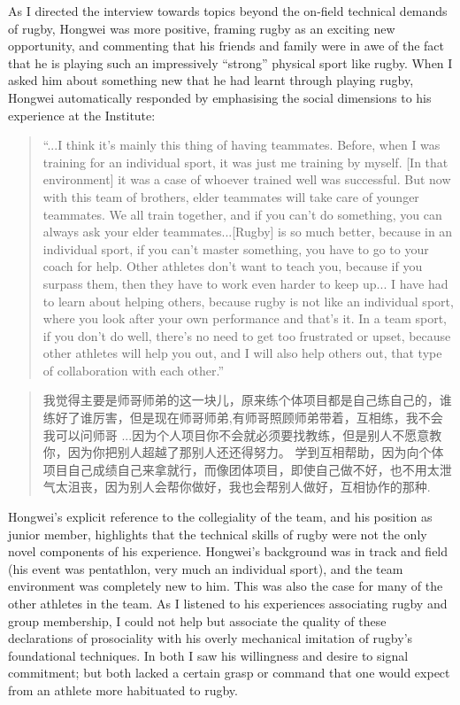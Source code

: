 \begin{CJK}{UTF8}{gbsn}
As I directed the interview towards topics beyond the on-field technical demands of rugby, Hongwei was more positive, framing rugby as an exciting new opportunity, and commenting that his friends and family were in awe of the fact that he is playing such an impressively ``strong'' physical sport like rugby.  When I asked him about something new that he had learnt through playing rugby, Hongwei automatically responded by emphasising the social dimensions to his experience at the Institute:

  \begin{quote}
    ``...I think it's mainly this thing of having teammates. Before, when I was training for an individual sport, it was just me training by myself. [In that environment] it was a case of whoever trained well was successful.  But now with this team of brothers, elder teammates will take care of younger teammates. We all train together, and if you can’t do something, you can always ask your elder teammates...[Rugby] is so much better, because in an individual sport, if you can't master something, you have to go to your coach for help. Other athletes don't want to teach you, because if you surpass them, then they have to work even harder to keep up... I have had to learn about helping others, because rugby is not like an individual sport, where you look after your own performance and that's it.  In a team sport, if you don't do well, there's no need to get too frustrated or upset, because other athletes will help you out, and I will also help others out, that type of collaboration with each other.''
  \end{quote}

\begin{CJK}{UTF8}{gbsn}
  \begin{quote}
    我觉得主要是师哥师弟的这一块儿，原来练个体项目都是自己练自己的，谁练好了谁厉害，但是现在师哥师弟,有师哥照顾师弟带着，互相练，我不会我可以问师哥
    ...因为个人项目你不会就必须要找教练，但是别人不愿意教你，因为你把别人超越了那别人还还得努力。 学到互相帮助，因为向个体项目自己成绩自己来拿就行，而像团体项目，即使自己做不好，也不用太泄气太沮丧，因为别人会帮你做好，我也会帮别人做好，互相协作的那种.
  \end{quote}
\end{CJK}

Hongwei's explicit reference to the collegiality of the team, and his position as junior member, highlights that the technical skills of rugby were not the only novel components of his experience.  Hongwei's background was in track and field (his event was pentathlon, very much an individual sport), and the team environment was completely new to him.  This was also the case for many of the other athletes in the team.  As I listened to his experiences associating rugby and group membership, I could not help but associate the quality of these declarations of prosociality with his overly mechanical imitation of rugby's foundational techniques.  In both I saw his willingness and desire to signal commitment; but both lacked a certain grasp or command that one would expect from an athlete more habituated to rugby.


\end{CJK}
